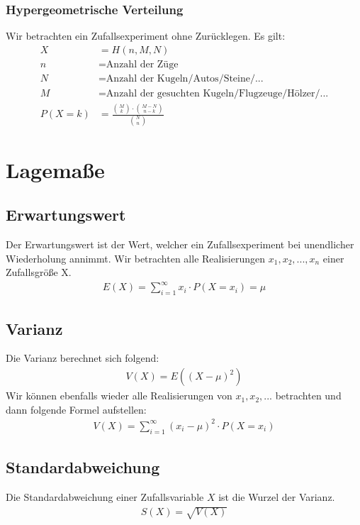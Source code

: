 \documentclass[a4paper]{article}
\begin{document}
		\subsubsection{Hypergeometrische Verteilung}
			Wir betrachten ein Zufallsexperiment ohne Zurücklegen. Es gilt:
			\begin{align*}
				X &= H(n, M, N) \\
				n &= \text{Anzahl der Züge}\\
				N &= \text{Anzahl der Kugeln/Autos/Steine/...}\\
				M &= \text{Anzahl der gesuchten Kugeln/Flugzeuge/Hölzer/...}\\
				P(X = k) &= \frac{ {M \choose k} \cdot {M-N \choose n-k}}{ {N \choose n}} 
			\end{align*}
		
	\section{Lagemaße}	
		\subsection{Erwartungswert}
			Der Erwartungswert ist der Wert, welcher ein Zufallsexperiment bei unendlicher Wiederholung annimmt. Wir betrachten alle Realisierungen $x_1, x_2, ... , x_n$ einer Zufallsgröße X.
			\begin{align*}
				E(X) = \sum_{i = 1}^{\infty} x_i \cdot P(X = x_i) = \mu				
			\end{align*}
		\subsection{Varianz}
			Die Varianz berechnet sich folgend:
			\begin{align*}
				V(X) = E((X-\mu)^2)
			\end{align*}
			Wir können ebenfalls wieder alle Realisierungen von $x_1, x_2, ...$  betrachten und dann folgende Formel aufstellen:
			\begin{align*}
				V(X) = \sum_{i = 1}^{\infty} (x_i - \mu)^2 \cdot P(X=x_i)
			\end{align*}
		\subsection{Standardabweichung}
			Die Standardabweichung einer Zufallsvariable $X$ ist die Wurzel der Varianz.
			\begin{align*}
				S(X) = \sqrt{V(X)}
			\end{align*}
\end{document}
